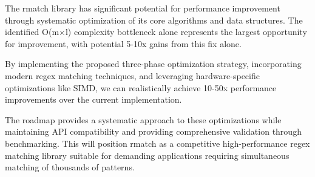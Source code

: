 \documentclass[11pt,a4paper]{article}
\begin{document}
The rmatch library has significant potential for performance improvement through systematic optimization of its core algorithms and data structures. The identified O(m×l) complexity bottleneck alone represents the largest opportunity for improvement, with potential 5-10x gains from this fix alone.

By implementing the proposed three-phase optimization strategy, incorporating modern regex matching techniques, and leveraging hardware-specific optimizations like SIMD, we can realistically achieve 10-50x performance improvements over the current implementation.

The roadmap provides a systematic approach to these optimizations while maintaining API compatibility and providing comprehensive validation through benchmarking. This will position rmatch as a competitive high-performance regex matching library suitable for demanding applications requiring simultaneous matching of thousands of patterns.



\end{document}
